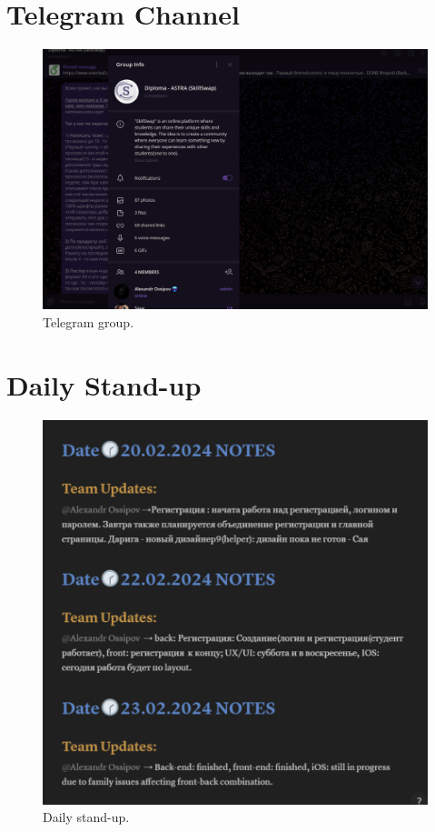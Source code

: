 \section{Telegram Channel}\label{telegram}
\begin{figure}[H]\label{fig:telegram}
  \centering
  \includegraphics[width=0.8\linewidth]{figures/Telegram group.png}
  \caption{Telegram group.}
\end{figure}
\section{Daily Stand-up}\label{standup}
\begin{figure}[H]\label{fig:standup}
  \centering
  \includegraphics[width=0.8\linewidth]{figures/Daily standup.png}
  \caption{Daily stand-up.}
\end{figure}
